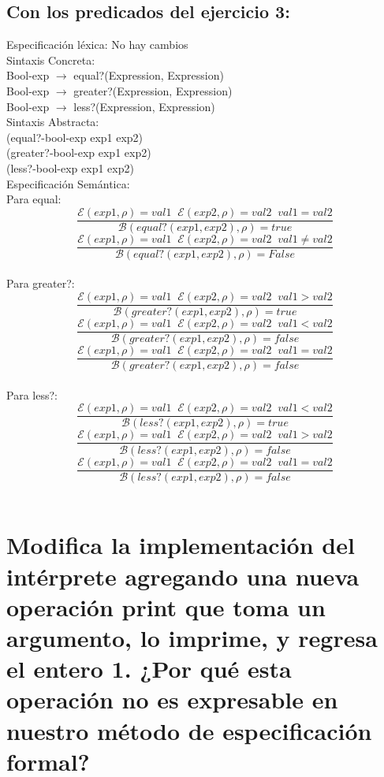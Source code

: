 \documentclass{article}
\begin{document}
\subsection{Con los predicados del ejercicio 3:}
Especificación léxica:
No hay cambios
\\
Sintaxis Concreta:
\\
Bool-exp $\rightarrow$ equal?(Expression, Expression)
\\
Bool-exp $\rightarrow$ greater?(Expression, Expression)
\\
Bool-exp $\rightarrow$ less?(Expression, Expression)
\\
Sintaxis Abstracta:
\\
(equal?-bool-exp exp1 exp2)
\\
(greater?-bool-exp exp1 exp2)
\\
(less?-bool-exp exp1 exp2)
\\
Especificación Semántica:
\\
Para equal:
$$\frac{\mathcal{E} (exp1, \rho) = val1 \;\; \mathcal{E} (exp2, \rho) = val2 \;\; val1 = val2}{\mathcal{B} (equal?(exp1, exp2), \rho ) = true}$$
$$\frac{\mathcal{E} (exp1, \rho) = val1 \;\; \mathcal{E} (exp2, \rho) = val2 \;\; val1 \neq val2}{\mathcal{B} (equal?(exp1, exp2), \rho ) = False}$$
\\
Para greater?:
$$\frac{\mathcal{E} (exp1, \rho) = val1 \;\; \mathcal{E} (exp2, \rho) = val2 \;\; val1 > val2}{\mathcal{B} (greater?(exp1, exp2), \rho ) = true}$$
$$\frac{\mathcal{E} (exp1, \rho) = val1 \;\; \mathcal{E} (exp2, \rho) = val2 \;\; val1 < val2}{\mathcal{B} (greater?(exp1, exp2), \rho ) = false}$$
$$\frac{\mathcal{E} (exp1, \rho) = val1 \;\; \mathcal{E} (exp2, \rho) = val2 \;\; val1 = val2}{\mathcal{B} (greater?(exp1, exp2), \rho ) = false}$$
\\
Para less?:
$$\frac{\mathcal{E} (exp1, \rho) = val1 \;\; \mathcal{E} (exp2, \rho) = val2 \;\; val1 < val2}{\mathcal{B} (less?(exp1, exp2), \rho ) = true}$$
$$\frac{\mathcal{E} (exp1, \rho) = val1 \;\; \mathcal{E} (exp2, \rho) = val2 \;\; val1 > val2}{\mathcal{B} (less?(exp1, exp2), \rho ) = false}$$
$$\frac{\mathcal{E} (exp1, \rho) = val1 \;\; \mathcal{E} (exp2, \rho) = val2 \;\; val1 = val2}{\mathcal{B} (less?(exp1, exp2), \rho ) = false}$$
\\

\section{Modifica la implementación del intérprete agregando una nueva operación print que
toma un argumento, lo imprime, y regresa el entero 1. ¿Por qué esta operación no es expresable en nuestro método de especificación formal?}
\end{document}
